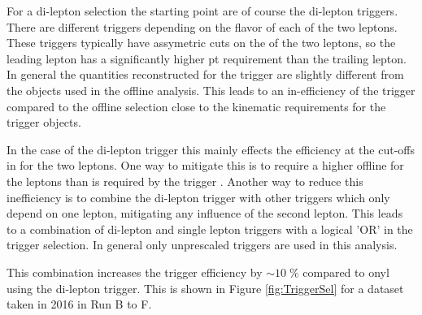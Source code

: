 For a di-lepton selection the starting point are of course the di-lepton triggers. There are different triggers depending on the flavor of each of the
two leptons. These triggers typically have assymetric cuts on the \pt of the two leptons, so the leading lepton has a significantly higher pt requirement than
the trailing lepton. In general the quantities reconstructed for the trigger are slightly different from the objects used in the offline analysis. This
leads to an in-efficiency of the trigger compared to the offline selection close to the kinematic requirements for the trigger objects.

In the case of the di-lepton trigger this mainly effects the efficiency at the cut-offs in \pt for the two leptons. One way to mitigate this is to
require a higher offline \pt for the leptons than is required by the trigger .
Another way to reduce this inefficiency is to combine the di-lepton trigger with other triggers which only depend on one lepton, mitigating any
influence of the second lepton. This leads to a combination of di-lepton and single lepton triggers with a logical 'OR' in the trigger selection.
In general only unprescaled triggers are used in this analysis.

This combination increases the trigger efficiency by $\sim 10 \; \%$ compared to onyl using the di-lepton trigger.
This is shown in Figure \ref{fig:TriggerSel} for a dataset taken in 2016 in Run B to F.

